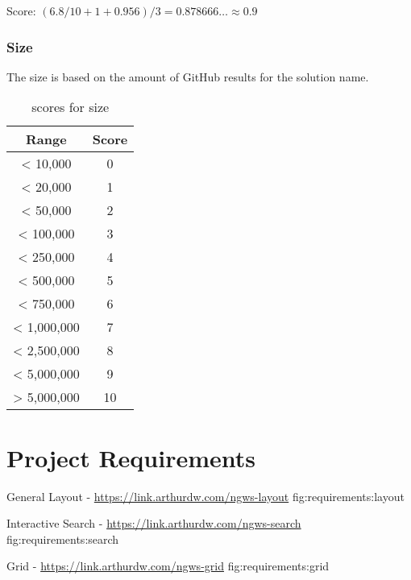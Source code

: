 Score: $(6.8 / 10 + 1 + 0.956) / 3 = 0.878666\dots \approx 0.9$

\subsection{Size}
\label{app:metrics:ecosystem:size}

The size is based on the amount of GitHub results for the solution name.

\begin{table}[H]
    \centering
    \begin{tabular}{|c|c|}
        \hline
        \textbf{Range} & \textbf{Score} \\
        \hline
        < 10,000       & 0              \\ \hline
        < 20,000       & 1              \\ \hline
        < 50,000       & 2              \\ \hline
        < 100,000      & 3              \\ \hline
        < 250,000      & 4              \\ \hline
        < 500,000      & 5              \\ \hline
        < 750,000      & 6              \\ \hline
        < 1,000,000    & 7              \\ \hline
        < 2,500,000    & 8              \\ \hline
        < 5,000,000    & 9              \\ \hline
        > 5,000,000    & 10             \\ \hline
    \end{tabular}
    \caption{scores for size }
    \label{tab:metrics:size}
\end{table}

\chapter{Project Requirements}

{General Layout - \url{https://link.arthurdw.com/ngws-layout}}
{fig:requirements:layout}

{Interactive Search - \url{https://link.arthurdw.com/ngws-search}}
{fig:requirements:search}

{Grid - \url{https://link.arthurdw.com/ngws-grid}}
{fig:requirements:grid}

